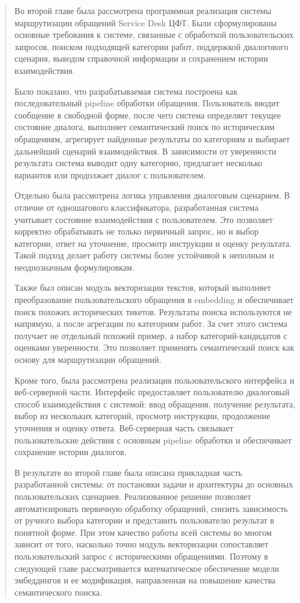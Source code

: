 \documentclass[
]{article}
\begin{document}
\begin{quote}
Во второй главе была рассмотрена программная реализация системы
маршрутизации обращений Service Desk ЦФТ. Были сформулированы основные
требования к системе, связанные с обработкой пользовательских запросов,
поиском подходящей категории работ, поддержкой диалогового сценария,
выводом справочной информации и сохранением истории взаимодействия.

Было показано, что разрабатываемая система построена как
последовательный pipeline обработки обращения. Пользователь вводит
сообщение в свободной форме, после чего система определяет текущее
состояние диалога, выполняет семантический поиск по историческим
обращениям, агрегирует найденные результаты по категориям и выбирает
дальнейший сценарий взаимодействия. В зависимости от уверенности
результата система выводит одну категорию, предлагает несколько
вариантов или продолжает диалог с пользователем.

Отдельно была рассмотрена логика управления диалоговым сценарием. В
отличие от одношагового классификатора, разработанная система учитывает
состояние взаимодействия с пользователем. Это позволяет корректно
обрабатывать не только первичный запрос, но и выбор категории, ответ на
уточнение, просмотр инструкции и оценку результата. Такой подход делает
работу системы более устойчивой к неполным и неоднозначным
формулировкам.

Также был описан модуль векторизации текстов, который выполняет
преобразование пользовательского обращения в embedding и обеспечивает
поиск похожих исторических тикетов. Результаты поиска используются не
напрямую, а после агрегации по категориям работ. За счет этого система
получает не отдельный похожий пример, а набор категорий-кандидатов с
оценками уверенности. Это позволяет применять семантический поиск как
основу для маршрутизации обращений.

Кроме того, была рассмотрена реализация пользовательского интерфейса и
веб-серверной части. Интерфейс предоставляет пользователю диалоговый
способ взаимодействия с системой: ввод обращения, получение результата,
выбор из нескольких категорий, просмотр инструкции, продолжение
уточнения и оценку ответа. Веб-серверная часть связывает
пользовательские действия с основным pipeline обработки и обеспечивает
сохранение истории диалогов.

В результате во второй главе была описана прикладная часть разработанной
системы: от постановки задачи и архитектуры до основных пользовательских
сценариев. Реализованное решение позволяет автоматизировать первичную
обработку обращений, снизить зависимость от ручного выбора категории и
представить пользователю результат в понятной форме. При этом качество
работы всей системы во многом зависит от того, насколько точно модуль
векторизации сопоставляет пользовательский запрос с историческими
обращениями. Поэтому в следующей главе рассматривается математическое
обеспечение модели эмбеддингов и ее модификация, направленная на
повышение качества семантического поиска.
\end{quote}
\end{document}
